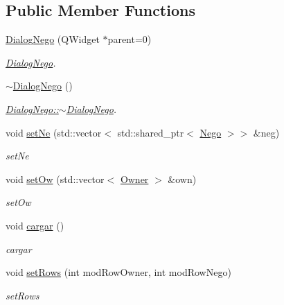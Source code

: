 \subsection*{Public Member Functions}
\begin{DoxyCompactItemize}
\item 
\hyperlink{classDialogNego_af8f2a27c7f024fd866eda40b6840ec04}{Dialog\+Nego} (Q\+Widget $\ast$parent=0)
\begin{DoxyCompactList}\small\item\em \hyperlink{classDialogNego}{Dialog\+Nego}. \end{DoxyCompactList}\item 
\hypertarget{classDialogNego_a674a6a1fd42ba00bd85279430f7e4d94}{}\hyperlink{classDialogNego_a674a6a1fd42ba00bd85279430f7e4d94}{$\sim$\+Dialog\+Nego} ()\label{classDialogNego_a674a6a1fd42ba00bd85279430f7e4d94}

\begin{DoxyCompactList}\small\item\em \hyperlink{classDialogNego_a674a6a1fd42ba00bd85279430f7e4d94}{Dialog\+Nego\+::$\sim$\+Dialog\+Nego}. \end{DoxyCompactList}\item 
void \hyperlink{classDialogNego_a559476945fd30cbe286824404eb76c89}{set\+Ne} (std\+::vector$<$ std\+::shared\+\_\+ptr$<$ \hyperlink{classNego}{Nego} $>$$>$ \&neg)
\begin{DoxyCompactList}\small\item\em set\+Ne \end{DoxyCompactList}\item 
void \hyperlink{classDialogNego_ab395a294d1be0e12b3ecf2a38742f713}{set\+Ow} (std\+::vector$<$ \hyperlink{classOwner}{Owner} $>$ \&own)
\begin{DoxyCompactList}\small\item\em set\+Ow \end{DoxyCompactList}\item 
void \hyperlink{classDialogNego_a5e976097b3dbecc695ed5153bc09d18a}{cargar} ()
\begin{DoxyCompactList}\small\item\em cargar \end{DoxyCompactList}\item 
void \hyperlink{classDialogNego_ad98c2abab579325665c3b2f615aeb08c}{set\+Rows} (int mod\+Row\+Owner, int mod\+Row\+Nego)
\begin{DoxyCompactList}\small\item\em set\+Rows \end{DoxyCompactList}\end{DoxyCompactItemize}


